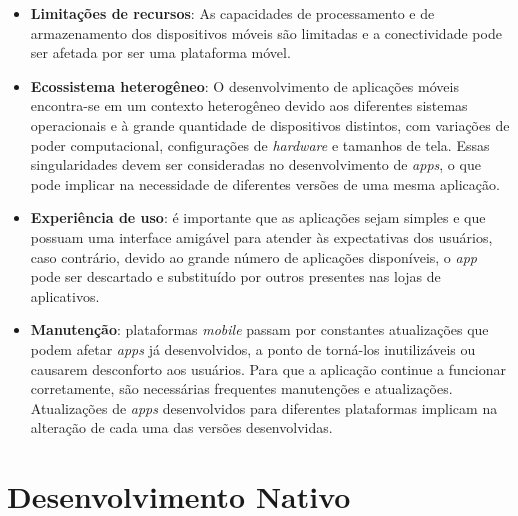 \begin{itemize}
	
    \item \textbf{Limitações de recursos}: As capacidades de processamento e de armazenamento dos dispositivos móveis são 
    limitadas e a conectividade pode ser afetada por ser uma plataforma móvel. 
    
    \item \textbf{Ecossistema heterogêneo}:   O desenvolvimento de aplicações móveis encontra-se em um contexto heterogêneo 
    devido aos diferentes sistemas operacionais e à grande quantidade de dispositivos distintos, com variações de poder computacional, 
    configurações de \textit{hardware} e tamanhos de tela.
    Essas singularidades devem ser consideradas no desenvolvimento de \textit{apps}, o que  pode implicar na necessidade de 
    diferentes versões de uma mesma aplicação.
    
    \item \textbf{Experiência de uso}: é importante que as aplicações sejam simples e que possuam uma interface amigável 
    para atender às expectativas dos usuários, caso contrário, devido ao grande número de aplicações disponíveis, o \textit{app} pode ser descartado e substituído por outros presentes nas lojas de aplicativos.
    
    \item \textbf{Manutenção}: plataformas \textit{mobile} passam por constantes atualizações que podem afetar 
    \textit{apps} já desenvolvidos, a ponto de torná-los inutilizáveis ou causarem desconforto aos usuários. 
    Para que a aplicação continue a funcionar corretamente, são necessárias frequentes manutenções e atualizações.
    Atualizações de \textit{apps} desenvolvidos para diferentes plataformas implicam na alteração de cada uma das versões desenvolvidas.
    
\end{itemize}

\section{Desenvolvimento Nativo} \label{section:desenvolvimentonativo}

